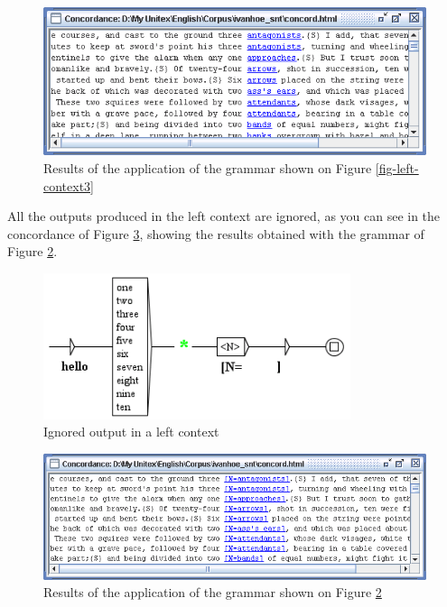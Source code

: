 \begin{figure}[!ht]
\begin{center}
\includegraphics[width=14cm]{resources/img/fig6-17d.png}
\caption{Results of the application of the grammar shown on Figure
\ref{fig-left-context3}\label{fig-left-context4}}
\end{center}
\end{figure}

\clearpage
\noindent All the outputs produced in the left context are ignored, as you can
see in the concordance of Figure \ref{fig-left-context6}, showing the results
obtained with the grammar of Figure \ref{fig-left-context5}.

\begin{figure}[!ht]
\begin{center}
\includegraphics[width=9cm]{resources/img/fig6-17e.png}
\caption{Ignored output in a left context\label{fig-left-context5}}
\end{center}
\end{figure}

\begin{figure}[!ht]
\begin{center}
\includegraphics[width=15cm]{resources/img/fig6-17f.png}
\caption{Results of the application of the grammar shown on Figure
\ref{fig-left-context5}\label{fig-left-context6}}
\end{center}
\end{figure}


